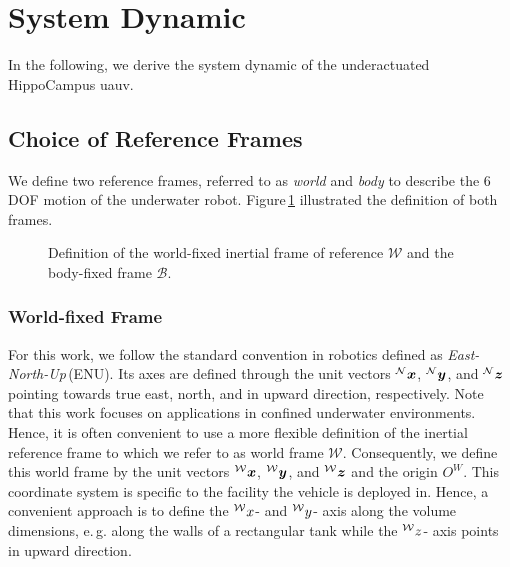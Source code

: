 \section{System Dynamic}
\label{sec:system-dynamics}
In the following, we derive the system dynamic of the underactuated HippoCampus \ac{uauv}.

\subsection{Choice of Reference Frames}
We define two reference frames, referred to as \textit{world} and \textit{body} to describe the 6\,DOF motion of the underwater robot.
Figure\,\ref{fig:reference_frames} illustrated the definition of both frames.
\begin{figure}[h!]
	\centering
	
	\caption{Definition of the world-fixed inertial frame of reference $\mathcal{W}$ and the body-fixed frame $\mathcal{B}$.}
 \label{fig:reference_frames}
\end{figure}

\subsubsection{World-fixed Frame}
For this work, we follow the standard convention in robotics defined as \textit{East-North-Up}\,(ENU).
Its axes are defined through the unit vectors $\prescript{\mathcal{N}}{}{\mbox{$\bm{x}$}}$, $\prescript{\mathcal{N}}{}{\mbox{$\bm{y}$}}$, and $\prescript{\mathcal{N}}{}{\mbox{$\bm{z}$}}$ pointing towards true east, north, and in upward direction, respectively.
Note that this work focuses on applications in confined underwater environments.
Hence, it is often convenient to use a more flexible definition of the inertial reference frame to which we refer to as world frame $\mathcal{W}$.
Consequently, we define this world frame by the unit vectors $\prescript{\mathcal{W}}{}{\mbox{$\bm{x}$}}$, $\prescript{\mathcal{W}}{}{\mbox{$\bm{y}$}}$, and $\prescript{\mathcal{W}}{}{\mbox{$\bm{z}$}}$ and the origin ${O}^{W}$.
This coordinate system is specific to the facility the vehicle is deployed in.
Hence, a convenient approach is to define the $\prescript{\mathcal{W}}{}{x}$- and $\prescript{\mathcal{W}}{}{y}$- axis along the volume dimensions, e.\,g. along the walls of a rectangular tank while the $\prescript{\mathcal{W}}{}{z}$- axis points in upward direction.
%
%
